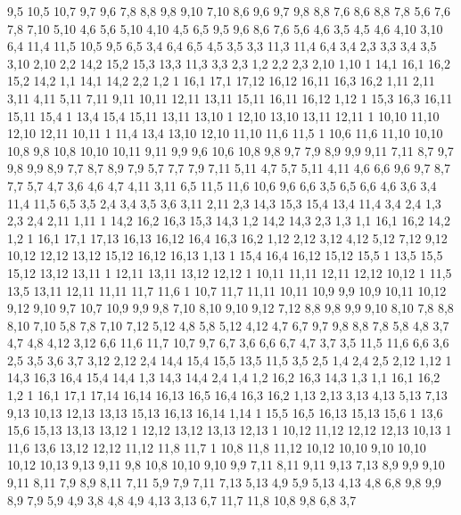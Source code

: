 %
9,5
10,5
10,7
9,7
9,6
%
7,8
8,8
9,8
9,10
7,10
%
8,6
9,6
9,7
9,8
8,8
%
7,6
8,6
8,8
7,8
%
5,6
7,6
7,8
7,10
5,10
%
4,6
5,6
5,10
4,10
%
4,5
6,5
9,5
9,6
8,6
7,6
5,6
4,6
%
3,5
4,5
4,6
4,10
3,10
%
6,4
11,4
11,5
10,5
9,5
6,5
%
3,4
6,4
6,5
4,5
3,5
%
3,3
11,3
11,4
6,4
3,4
%
2,3
3,3
3,4
3,5
3,10
2,10
%
2,2
14,2
15,2
15,3
13,3
11,3
3,3
2,3
%
1,2
2,2
2,3
2,10
1,10
1%
14,1
16,1
16,2
15,2
14,2
%
1,1
14,1
14,2
2,2
1,2
1%
16,1
17,1
17,12
16,12
16,11
16,3
16,2
%
1,11
2,11
3,11
4,11
5,11
7,11
9,11
10,11
12,11
13,11
15,11
16,11
16,12
1,12
1%
15,3
16,3
16,11
15,11
15,4
1%
13,4
15,4
15,11
13,11
13,10
1%
12,10
13,10
13,11
12,11
1%
10,10
11,10
12,10
12,11
10,11
1%
11,4
13,4
13,10
12,10
11,10
11,6
11,5
1%
10,6
11,6
11,10
10,10
10,8
%
9,8
10,8
10,10
10,11
9,11
9,9
%
9,6
10,6
10,8
9,8
9,7
%
7,9
8,9
9,9
9,11
7,11
%
8,7
9,7
9,8
9,9
8,9
%
7,7
8,7
8,9
7,9
%
5,7
7,7
7,9
7,11
5,11
%
4,7
5,7
5,11
4,11
%
4,6
6,6
9,6
9,7
8,7
7,7
5,7
4,7
%
3,6
4,6
4,7
4,11
3,11
%
6,5
11,5
11,6
10,6
9,6
6,6
%
3,5
6,5
6,6
4,6
3,6
%
3,4
11,4
11,5
6,5
3,5
%
2,4
3,4
3,5
3,6
3,11
2,11
%
2,3
14,3
15,3
15,4
13,4
11,4
3,4
2,4
%
1,3
2,3
2,4
2,11
1,11
1%
14,2
16,2
16,3
15,3
14,3
%
1,2
14,2
14,3
2,3
1,3
%
1,1
16,1
16,2
14,2
1,2
1%
16,1
17,1
17,13
16,13
16,12
16,4
16,3
16,2
%
1,12
2,12
3,12
4,12
5,12
7,12
9,12
10,12
12,12
13,12
15,12
16,12
16,13
1,13
1%
15,4
16,4
16,12
15,12
15,5
1%
13,5
15,5
15,12
13,12
13,11
1%
12,11
13,11
13,12
12,12
1%
10,11
11,11
12,11
12,12
10,12
1%
11,5
13,5
13,11
12,11
11,11
11,7
11,6
1%
10,7
11,7
11,11
10,11
10,9
%
9,9
10,9
10,11
10,12
9,12
9,10
%
9,7
10,7
10,9
9,9
9,8
%
7,10
8,10
9,10
9,12
7,12
%
8,8
9,8
9,9
9,10
8,10
%
7,8
8,8
8,10
7,10
%
5,8
7,8
7,10
7,12
5,12
%
4,8
5,8
5,12
4,12
%
4,7
6,7
9,7
9,8
8,8
7,8
5,8
4,8
%
3,7
4,7
4,8
4,12
3,12
%
6,6
11,6
11,7
10,7
9,7
6,7
%
3,6
6,6
6,7
4,7
3,7
%
3,5
11,5
11,6
6,6
3,6
%
2,5
3,5
3,6
3,7
3,12
2,12
%
2,4
14,4
15,4
15,5
13,5
11,5
3,5
2,5
%
1,4
2,4
2,5
2,12
1,12
1%
14,3
16,3
16,4
15,4
14,4
%
1,3
14,3
14,4
2,4
1,4
%
1,2
16,2
16,3
14,3
1,3
%
1,1
16,1
16,2
1,2
1%
16,1
17,1
17,14
16,14
16,13
16,5
16,4
16,3
16,2
%
1,13
2,13
3,13
4,13
5,13
7,13
9,13
10,13
12,13
13,13
15,13
16,13
16,14
1,14
1%
15,5
16,5
16,13
15,13
15,6
1%
13,6
15,6
15,13
13,13
13,12
1%
12,12
13,12
13,13
12,13
1%
10,12
11,12
12,12
12,13
10,13
1%
11,6
13,6
13,12
12,12
11,12
11,8
11,7
1%
10,8
11,8
11,12
10,12
10,10
%
9,10
10,10
10,12
10,13
9,13
9,11
%
9,8
10,8
10,10
9,10
9,9
%
7,11
8,11
9,11
9,13
7,13
%
8,9
9,9
9,10
9,11
8,11
%
7,9
8,9
8,11
7,11
%
5,9
7,9
7,11
7,13
5,13
%
4,9
5,9
5,13
4,13
%
4,8
6,8
9,8
9,9
8,9
7,9
5,9
4,9
%
3,8
4,8
4,9
4,13
3,13
%
6,7
11,7
11,8
10,8
9,8
6,8
%
3,7

